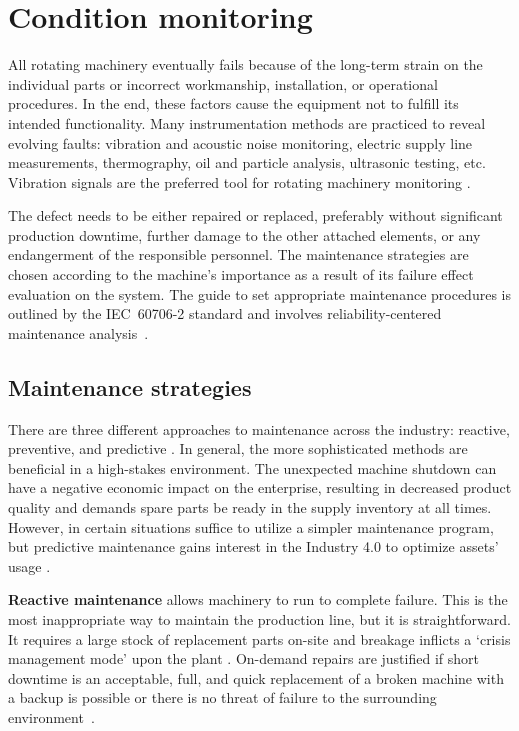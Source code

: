 \section{Condition monitoring}
All rotating machinery eventually fails because of the long-term strain on the individual parts or incorrect workmanship, installation, or operational procedures. In the end, these factors cause the equipment not to fulfill its intended functionality. Many instrumentation methods are practiced to reveal evolving faults: vibration and acoustic noise monitoring, electric supply line measurements, thermography, oil and particle analysis, ultrasonic testing, etc. Vibration signals are the preferred tool for rotating machinery monitoring \cite{mohanty_machinery_2015}.

The defect needs to be either repaired or replaced, preferably without significant production downtime, further damage to the other attached elements, or any endangerment of the responsible personnel. The maintenance strategies are chosen according to the machine's importance as a result of its failure effect evaluation on the system. The guide to set appropriate maintenance procedures is outlined by the IEC~60706-2 standard and involves reliability-centered maintenance analysis~\cite{el-thalji_predictive_2019}.

\subsection{Maintenance strategies}
There are three different approaches to maintenance across the industry: reactive, preventive, and predictive \cite{scheffer_practical_2004}. In general, the more sophisticated methods are beneficial in a high-stakes environment. The unexpected machine shutdown can have a negative economic impact on the enterprise, resulting in decreased product quality and demands spare parts be ready in the supply inventory at all times. However, in certain situations suffice to utilize a simpler maintenance program, but predictive maintenance gains interest in the Industry 4.0 to optimize assets' usage  \cite{cinar_machine_2020}.
\bigbreak

\textbf{Reactive maintenance} allows machinery to run to complete failure. This is the most inappropriate way to maintain the production line, but it is straightforward. It requires a large stock of replacement parts on-site and breakage inflicts a `crisis management mode' upon the plant \cite{scheffer_practical_2004}. On-demand repairs are justified if short downtime is an acceptable,  full, and quick replacement of a broken machine with a backup is possible or there is no threat of failure to the surrounding environment~\cite{ziaran_technicka_2013}.
\bigbreak

